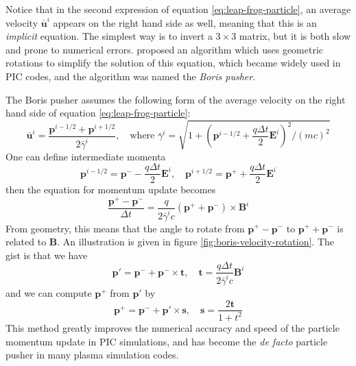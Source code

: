 Notice that in the second expression of equation \eqref{eq:leap-frog-particle},
an average velocity $\bar{\mathbf{u}}^{i}$ appears on the right hand side as
well, meaning that this is an {\it implicit} equation. The simplest way is to
invert a $3\times 3$ matrix, but it is both slow and prone to numerical errors.
\citet{boris_relativistic_1970} proposed an algorithm which uses geometric rotations to
simplify the solution of this equation, which became widely used in PIC codes,
and the algorithm was named the {\it Boris pusher}.

The Boris pusher assumes the following form of the average velocity on the right
hand side of equation \eqref{eq:leap-frog-particle}:
\begin{equation}
  \label{eq:boris-average-u}
  \bar{\mathbf{u}}^{i} = \frac{\mathbf{p}^{i-1/2} + \mathbf{p}^{i+1/2}}{2\bar{\gamma}^i},\quad \text{where } \bar{\gamma}^i = \sqrt{1 + \left( \mathbf{p}^{i-1/2} + \frac{q\Delta t}{2}\mathbf{E}^i \right)^2/(mc)^2}
\end{equation}
One can define intermediate momenta
\begin{equation}
  \label{eq:boris-intermediate-momenta}
  \mathbf{p}^{i-1/2} = \mathbf{p}^{-} - \frac{q\Delta t}{2}\mathbf{E}^{i},\quad \mathbf{p}^{i+1/2} = \mathbf{p}^{+} + \frac{q\Delta t}{2}\mathbf{E}^i
\end{equation}
then the equation for momentum update becomes
\begin{equation}
  \label{eq:boris-momentum-update}
  \frac{\mathbf{p}^+-\mathbf{p}^{-}}{\Delta t} = \frac{q}{2 \bar{\gamma}^ic}(\mathbf{p}^+ + \mathbf{p}^{-})\times \mathbf{B}^{i}
\end{equation}
From geometry, this means that the angle to rotate from
$\mathbf{p}^+-\mathbf{p}^{-}$ to $\mathbf{p}^++\mathbf{p}^{-}$ is related to
$\mathbf{B}$. An illustration is given in figure
\ref{fig:boris-velocity-rotation}. The gist is that we have
\begin{equation}
  \mathbf{p}' = \mathbf{p}^{-} + \mathbf{p}^{-}\times \mathbf{t},\quad \mathbf{t} = \frac{q\Delta t}{2\bar{\gamma}^ic}\mathbf{B}^{i}
\end{equation}
and we can compute $\mathbf{p}^{+}$ from $\mathbf{p}'$ by
\begin{equation}
  \mathbf{p}^+ = \mathbf{p}^{-} + \mathbf{p}'\times \mathbf{s},\quad \mathbf{s} = \frac{2\mathbf{t}}{1 + t^2}
\end{equation}
This method greatly improves the numerical accuracy and speed of the particle
momentum update in PIC simulations, and has become the {\it de facto} particle
pusher in many plasma simulation codes.

